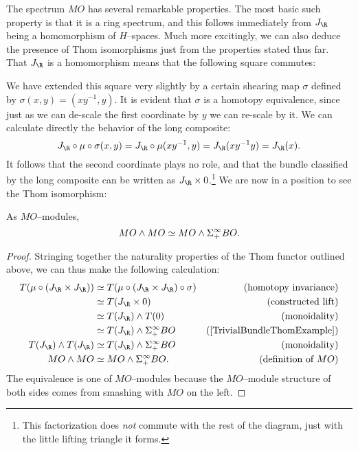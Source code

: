 The spectrum $MO$ has several remarkable properties.  The most basic such property is that it is a ring spectrum, and this follows immediately from $J_{\R}$ being a homomorphism of $H$--spaces.  Much more excitingly, we can also deduce the presence of Thom isomorphisms just from the properties stated thus far.  That $J_{\R}$ is a homomorphism means that the following square commutes:
\begin{center}
\end{center}
We have extended this square very slightly by a certain shearing map $\sigma$ defined by $\sigma(x, y) = (xy^{-1}, y)$.
It is evident that $\sigma$ is a homotopy equivalence, since just as we can de-scale the first coordinate by $y$ we can re-scale by it.  We can calculate directly the behavior of the long composite: \[J_{\R} \circ \mu \circ \sigma(x, y) = J_{\R} \circ \mu(xy^{-1}, y) = J_{\R}(xy^{-1}y) = J_{\R}(x).\]  It follows that the second coordinate plays no role, and that the bundle classified by the long composite can be written as $J_{\R} \times 0$.\footnote{This factorization does \emph{not} commute with the rest of the diagram, just with the little lifting triangle it forms.}  We are now in a position to see the Thom isomorphism:
\begin{lemma}
As $MO$--modules, \[MO \wedge MO \simeq MO \wedge \Sigma^\infty_+ BO.\]
\end{lemma}
\begin{proof}
Stringing together the naturality properties of the Thom functor outlined above, we can thus make the following calculation:
\begin{align*}
T(\mu \circ (J_{\R} \times J_{\R})) & \simeq T(\mu \circ (J_{\R} \times J_{\R}) \circ \sigma) & \text{(homotopy invariance)} \\
& \simeq T(J_{\R} \times 0) & \text{(constructed lift)} \\
& \simeq T(J_{\R}) \sm T(0) & \text{(monoidality)} \\
& \simeq T(J_{\R}) \sm \Susp^\infty_+ BO & \text{(\Cref{TrivialBundleThomExample})} \\
T(J_{\R}) \sm T(J_{\R}) & \simeq T(J_{\R}) \sm \Susp^\infty_+ BO & \text{(monoidality)} \\
MO \sm MO & \simeq MO \sm \Susp^\infty_+ BO. & \text{(definition of $MO$)}
\end{align*}
The equivalence is one of $MO$--modules because the $MO$--module structure of both sides comes from smashing with $MO$ on the left.
\end{proof}

